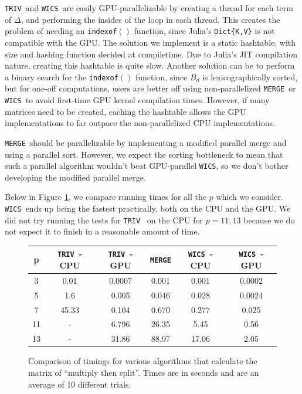 \documentclass[a4paper]{article}
\newcommand{\code}[1]{\textnormal{\texttt{#1}}}
\theoremstyle{definition}
\theoremstyle{remark}
\newcommand{\triv}{\texttt{TRIV}}
\newcommand{\merge}{\texttt{MERGE}}
\newcommand{\wicsalg}{\texttt{WICS}}
\begin{document}
\triv ~and \wicsalg ~are easily GPU-parallelizable by creating 
a thread for each term of $\Delta$, and performing the insides of the loop in each thread.
This creates the problem of needing an \code{indexof}$()$ function, 
since Julia's \texttt{Dict\{K,V\}} is not compatible with the GPU.
The solution we implement is a static hashtable, with size 
and hashing function decided at compiletime.
Due to Julia's JIT compilation nature, creating this 
hashtable is quite slow.
Another solution can be to perform a binary search 
for the \code{indexof}$()$ function, since $B_d$ is lexicographically 
sorted, but for one-off computations, users are better 
off using non-parallelized \merge ~or \wicsalg ~to avoid 
first-time GPU kernel compilation times.
However, if many matrices need to be created, caching 
the hashtable allows the GPU implementations to far outpace 
the non-parallelized CPU implementations.

\merge ~should be parallelizable by implementing a modified parallel merge and using a parallel sort. 
However, we expect the sorting bottleneck to mean that such a parallel algorithm wouldn't beat GPU-parallel \wicsalg,
so we don't bother developing the modified parallel merge.

Below in Figure \ref{fig:momts:compare}, we compare running times 
for all the \(p\) which we consider. 
\wicsalg \, ends up being the fastest practically, 
both on the CPU and the GPU.
We did not try running the tests for \triv~ on the 
CPU for \(p=11,13\) because we do not expect 
it to finish in a reasonable
amount of time.

\begin{figure}[ht]
\label{fig:momts:compare}
\begin{center}
\begin{tabular}{c c c c c c}
    \toprule
    p & \triv ~- CPU & \triv ~- GPU & \merge   & \wicsalg ~- CPU & \wicsalg ~- GPU \\
    \midrule
    3 & 0.01   & 0.0007  & 0.001  & 0.001   & 0.0002  \\                                       
    5 & 1.6    & 0.005   & 0.046  & 0.028   & 0.0024  \\
    7 & 45.33  & 0.104   & 0.670  & 0.277   & 0.025  \\
    11 &    -  & 6.796   & 26.35  & 5.45    & 0.56  \\
    13 &    -  & 31.86   & 88.97  & 17.06   & 2.05 \\
    \bottomrule
\end{tabular}
\caption{Comparison of timings for various algorithms that calculate
the matrix of ``multiply then split''. 
Times are in seconds
and are an average of 10 different trials.}
\end{center}
\end{figure}
\end{document}
